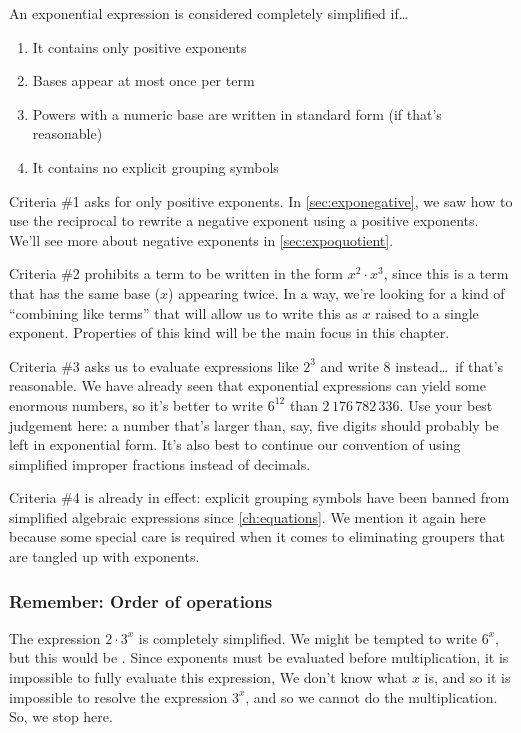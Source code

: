 \begin{boxedcriteria}
An exponential expression is considered completely simplified if\ldots
\begin{enumerate}
	\item It contains only positive exponents
	\item Bases appear at most once per term
	\item Powers with a numeric base are written in standard form (if that's reasonable)
	\item It contains no explicit grouping symbols
\end{enumerate}
\end{boxedcriteria}

Criteria \#1 asks for only positive exponents. In \cref{sec:exponegative}, we saw how to use the reciprocal to rewrite a negative exponent using a positive exponents. We'll see more about negative exponents in \cref{sec:expoquotient}.

Criteria \#2 prohibits a term to be written in the form $x^2 \cdot x^3$, since this is a term that has the same base ($x$) appearing twice. In a way, we're looking for a kind of ``combining like terms'' that will allow us to write this as $x$ raised to a single exponent. Properties of this kind will be the main focus in this chapter.

Criteria \#3 asks us to evaluate expressions like $2^3$ and write 8 instead\ldots\ if that's reasonable. We have already seen that exponential expressions can yield some enormous numbers, so it's better to write $6^{12}$ than $2\,176\,782\,336$. Use your best judgement here: a number that's larger than, say, five digits should probably be left in exponential form. It's also best to continue our convention of using simplified improper fractions instead of decimals.

Criteria \#4 is already in effect: explicit grouping symbols have been banned from simplified algebraic expressions since \cref{ch:equations}. We mention it again here because some special care is required when it comes to eliminating groupers that are tangled up with exponents.

\subsubsection{Remember: Order of operations}

The expression $2 \cdot 3^x$ is completely simplified. We might be tempted to write $6^x$, but this would be \evilandwrong. Since exponents must be evaluated before multiplication, it is impossible to fully evaluate this expression, We don't know what $x$ is, and so it is impossible to resolve the expression $3^x$, and so we cannot do the multiplication. So, we stop here.


